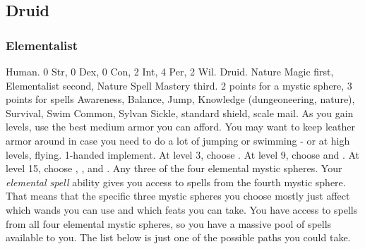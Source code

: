     \subsection{Druid}

        \subsubsection{Elementalist}
             Human.
             0 Str, 0 Dex, 0 Con, 2 Int, 4 Per, 2 Wil.
             Druid.
             Nature Magic first, Elementalist second, Nature Spell Mastery third.
             2 points for a mystic sphere, 3 points for spells
             Awareness, Balance, Jump, Knowledge (dungeoneering, nature), Survival, Swim
             Common, Sylvan
             Sickle, standard shield, scale mail. As you gain levels, use the best medium armor you can afford.
            You may want to keep leather armor around in case you need to do a lot of jumping or swimming - or at high levels, flying.
             1-handed implement.
                At level 3, choose .
                At level 9, choose  and .
                At level 15, choose , , and .
             Any three of the four elemental mystic spheres.
            Your \textit{elemental spell} ability gives you access to spells from the fourth mystic sphere.
            That means that the specific three mystic spheres you choose mostly just affect which wands you can use and which feats you can take.
            You have access to spells from all four elemental mystic spheres, so you have a massive pool of spells available to you.
            The list below is just one of the possible paths you could take.
